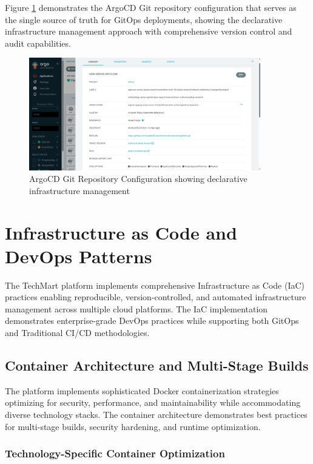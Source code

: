 Figure \ref{fig:argocd-git-repository-config} demonstrates the ArgoCD Git repository configuration that serves as the single source of truth for GitOps deployments, showing the declarative infrastructure management approach with comprehensive version control and audit capabilities.

\begin{figure}[H]
\centering
\includegraphics[width=0.9\textwidth]{figures/chapter4/argocd-git-repository-config.png}
\caption{ArgoCD Git Repository Configuration showing declarative infrastructure management}
\label{fig:argocd-git-repository-config}
\end{figure}

\section{Infrastructure as Code and DevOps Patterns}

The TechMart platform implements comprehensive Infrastructure as Code (IaC) practices enabling reproducible, version-controlled, and automated infrastructure management across multiple cloud platforms. The IaC implementation demonstrates enterprise-grade DevOps practices while supporting both GitOps and Traditional CI/CD methodologies.

\subsection{Container Architecture and Multi-Stage Builds}

The platform implements sophisticated Docker containerization strategies optimizing for security, performance, and maintainability while accommodating diverse technology stacks. The container architecture demonstrates best practices for multi-stage builds, security hardening, and runtime optimization.

\subsubsection{Technology-Specific Container Optimization}


